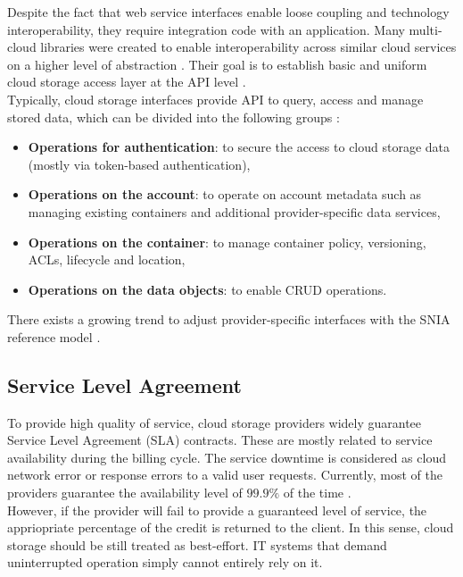 Despite the fact that web service interfaces enable loose coupling and
technology interoperability, they require integration code with an application.
Many multi-cloud libraries were created to enable interoperability across
similar cloud services on a higher level of abstraction 
\cite{cloud-federation}. Their goal is to establish basic and uniform cloud
storage access layer at the API level \cite{jclouds, libcloud}.\\

Typically, cloud storage interfaces provide API to query, access and manage
stored data, which can be divided into the following groups
\cite{amazon-s3, rackspace-cloud, google-cloud, openstack-cloud, 
eucalyptus-cloud}:\\

\begin{itemize}
	\item \textbf{Operations for authentication}: to secure the access to
	cloud storage data (mostly via token-based authentication),  
	\item \textbf{Operations on the account}: to operate on account metadata
	such as managing existing containers and additional provider-specific data
	services,
	\item \textbf{Operations on the container}: to manage container policy, 
	versioning, ACLs, lifecycle and location,
	\item \textbf{Operations on the data objects}: to enable CRUD operations.
\end{itemize} 

There exists a growing trend to adjust provider-specific interfaces with the
SNIA reference model \cite{amazon-s3, rackspace-cloud, openstack-cloud}.
		
		\subsection{Service Level Agreement}
To provide high quality of service, cloud storage providers widely guarantee
Service Level Agreement (SLA) contracts. These are mostly related to service
availability during the billing cycle. The service downtime is considered as
cloud network error or response errors to a valid user requests. Currently,
most of the providers guarantee the availability level of $99.9\%$ of the time
\cite{amazon-s3, rackspace-cloud, google-cloud}.\\

However, if the provider will fail to provide a guaranteed level of service,
the appriopriate percentage of the credit is returned to the client. In this
sense, cloud storage should be still treated as best-effort. IT systems that
demand uninterrupted operation simply cannot entirely rely on it.\\


